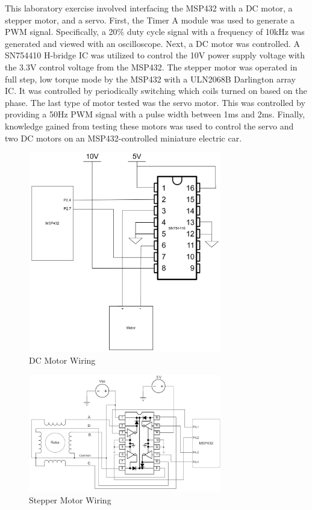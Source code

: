 \documentclass[CMPE]{KGCOEReport}
\begin{document}
\maketitle

This laboratory exercise involved interfacing the MSP432 with a DC motor, a stepper motor, and a servo. First, the Timer A module was used to generate a PWM signal. Specifically, a 20\% duty cycle signal with a frequency of 10kHz was generated and viewed with an oscilloscope. Next, a DC motor was controlled. A SN754410 H-bridge IC was utilized to control the 10V power supply voltage with the 3.3V control voltage from the MSP432. The stepper motor was operated in full step, low torque mode by the MSP432 with a ULN2068B Darlington array IC. It was controlled by periodically switching which coils turned on based on the phase. The last type of motor tested was the servo motor. This was controlled by providing a 50Hz PWM signal with a pulse width between 1ms and 2ms. Finally, knowledge gained from testing these motors was used to control the servo and two DC motors on an MSP432-controlled miniature electric car.

\begin{figure}[H]
    \centering
    \includegraphics[width=0.75\textwidth]{DCMotorWiring.png}
    \caption{DC Motor Wiring}
    \label{fig:DCMotorWiring}
\end{figure}

\begin{figure}[H]
    \centering
    \includegraphics[width=0.75\textwidth]{StepperWiring.png}
    \caption{Stepper Motor Wiring}
    \label{fig:ServoWiring}
\end{figure}
\end{document}
